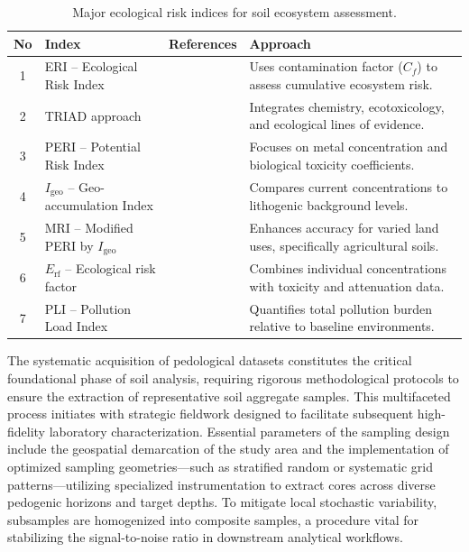 \documentclass[preprint,12pt]{elsarticle}            %
\begin{document}
\begin{table}[htbp]
\centering
\caption{Major ecological risk indices for soil ecosystem assessment.}
\label{tab2_expanded}
\begin{tabularx}{\textwidth}{@{} c p{3.5cm} X p{5.5cm} @{}}
\toprule
\textbf{No} & \textbf{Index} & \textbf{References} & \textbf{Approach} \\
\midrule
1 & ERI -- Ecological Risk Index
    & \cite{Wang2025,Egbueri2020,Adewumi2024,ElSorogy2025,Sidoruk2023,Siddig2025,Fan2025,Proshad2025,AnsoarRodriguez2025}
    & Uses contamination factor ($C_f$) to assess cumulative ecosystem
      risk. \\[4pt]
2 & TRIAD approach
    & \cite{Kim2024,Chon2011,LindhLemenkova2023b,Rasafi2021,Stojic2019,Mohammad2025,Toumi2025,Yasir2025}
    & Integrates chemistry, ecotoxicology, and ecological lines of
      evidence. \\[4pt]
3 & PERI -- Potential Risk Index
    & \cite{AnsoarRodriguez2025,Ferreira2022,Li2025a,Sidoruk2023,Siddig2025,Li2020,Wang2024a,Wang2025}
    & Focuses on metal concentration and biological toxicity
      coefficients. \\[4pt]
4 & $I_{\mathrm{geo}}$ -- Geo-accumulation Index
    & \cite{Li2014,ElSorogy2025,Wang2020,Sidoruk2023,Siddig2025,AliZerrouki2021,LindhLemenkova2022a,Racic2025}
    & Compares current concentrations to lithogenic background
      levels. \\[4pt]
5 & MRI -- Modified PERI by $I_{\mathrm{geo}}$
    & \cite{Liu2021,Ferreira2022,Siddig2025,Li2019,Adewumi2024,Wang2024a,Wang2025,Proshad2025}
    & Enhances accuracy for varied land uses, specifically agricultural
      soils. \\[4pt]
6 & $E_{\mathrm{rf}}$ -- Ecological risk factor
    & \cite{Li2025a,Liu2021,Shetty2025,Marthandan2020,Sun2025,Sidoruk2023}
    & Combines individual concentrations with toxicity and attenuation
      data. \\[4pt]
7 & PLI -- Pollution Load Index
    & \cite{Li2022b,Chukwuonye2025,Wan2019,Mukhopadhyay2020,Sidoruk2023,Li2020,Wang2020,ElSorogy2025}
    & Quantifies total pollution burden relative to baseline
      environments. \\
\bottomrule
\end{tabularx}
\end{table}

The systematic acquisition of pedological datasets constitutes the critical
foundational phase of soil analysis, requiring rigorous methodological
protocols to ensure the extraction of representative soil aggregate samples.
This multifaceted process initiates with strategic fieldwork designed to
facilitate subsequent high-fidelity laboratory characterization. Essential
parameters of the sampling design include the geospatial demarcation of the
study area and the implementation of optimized sampling geometries---such as
stratified random or systematic grid patterns---utilizing specialized
instrumentation to extract cores across diverse pedogenic horizons and target
depths. To mitigate local stochastic variability, subsamples are homogenized
into composite samples, a procedure vital for stabilizing the signal-to-noise
ratio in downstream analytical workflows.
\end{document}
